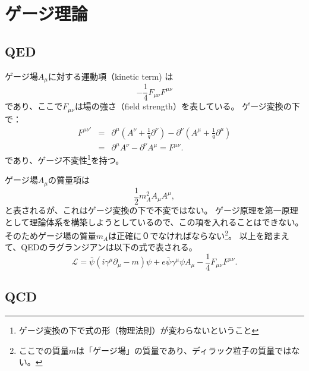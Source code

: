 \chapter{ゲージ理論}


\section{QED}

ゲージ場$A_{\mu}$に対する運動項（kinetic term) は
\begin{equation}
  -\frac{1}{4}F_{\mu\nu}F^{\mu\nu}
\end{equation}
であり、ここで$F_{\mu\nu}$は場の強さ（field strength）を表している。
ゲージ変換の下で：
\begin{eqnarray}
  F^{\mu\nu\prime}
  &=& \partial^{\mu}(A^{\nu}+\frac{1}{q}\partial^{\nu}) - \partial^{\nu}(A^{\mu}+\frac{1}{q}\partial^{\mu}) \\
  &=& \partial^{\mu}A^{\nu} - \partial^{\nu}A^{\mu} = F^{\mu\nu}.
\end{eqnarray}
であり、ゲージ不変性\footnote{ゲージ変換の下で式の形（物理法則）が変わらないということ}を持つ。

ゲージ場$A_{\mu}$の質量項は
\begin{equation}
  \frac{1}{2}m_A^2A_{\mu}A^{\mu},
\end{equation}
と表されるが、これはゲージ変換の下で不変ではない。
ゲージ原理を第一原理として理論体系を構築しようとしているので、この項を入れることはできない。
そのためゲージ場の質量$m_A$は正確に０でなければならない\footnote{ここでの質量$m$は「ゲージ場」の質量であり、ディラック粒子の質量ではない。}。
以上を踏まえて、QEDのラグランジアンは以下の式で表される。
\begin{equation}
  \mathcal{L} = \bar{\psi}(i\gamma^{\mu}\partial_{\mu}-m)\psi + e\bar{\psi}\gamma^{\mu}\psi A_{\mu} -\frac{1}{4}F_{\mu\nu}F^{\mu\nu}.
\end{equation}

\section{QCD}
